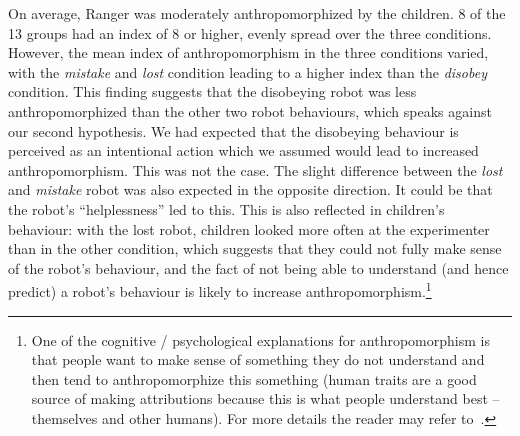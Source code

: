 \documentclass[letterpaper, 10pt, conference]{ieeeconf}
\begin{document}
On average, Ranger was moderately anthropomorphized by the children. 8 of the 13
groups had an index of 8 or higher, evenly spread over the three conditions.
However, the mean index of anthropomorphism in the three conditions varied, with
the \textit{mistake} and \textit{lost} condition leading to a higher index than
the \textit{disobey} condition. This finding suggests that the disobeying robot
was less anthropomorphized than the other two robot behaviours, which speaks
against our second hypothesis. We had expected that the disobeying behaviour is
perceived as an intentional action which we assumed would lead to increased
anthropomorphism. This was not the case. The slight difference between the
\textit{lost} and \textit{mistake} robot was also expected in the opposite
direction. It could be that the robot's ``helplessness'' led to this. This is
also reflected in children's behaviour: with the lost robot, children looked
more often at the experimenter than in the other condition, which suggests that
they could not fully make sense of the robot's behaviour, and the fact of not
being able to understand (and hence predict) a robot's behaviour is likely to
increase anthropomorphism.\footnote{One of the cognitive / psychological
explanations for anthropomorphism is that people want to make sense of
something they do not understand and then tend to anthropomorphize this
something (human traits are a good source of making attributions because
this is what people understand best -- themselves and other humans). For
more details the reader may refer to~\cite{epley_seeing_2007}.}
%
%
%
\end{document}
